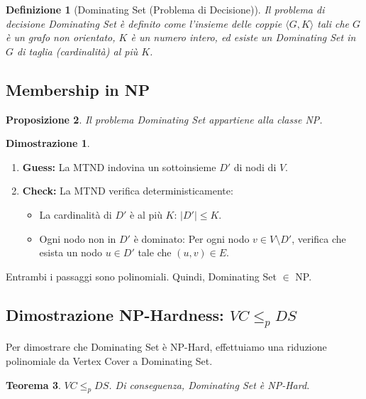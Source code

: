 \documentclass[a4paper, 11pt]{book} %
\newtheorem{theorem}{Teorema}[section]
\newtheorem{definition}[theorem]{Definizione}
\newtheorem{proposition}[theorem]{Proposizione}
\theoremstyle{definition}
\newtheorem*{proof*}{Dimostrazione}
\begin{document}
\begin{definition}[Dominating Set (Problema di Decisione)]
Il problema di decisione \emph{Dominating Set} è definito come l'insieme delle coppie $\langle G, K \rangle$ tali che $G$ è un grafo non orientato, $K$ è un numero intero, ed esiste un Dominating Set in $G$ di taglia (cardinalità) al più $K$.
\end{definition}

\subsection{Membership in NP}

\begin{proposition}
Il problema \emph{Dominating Set} appartiene alla classe NP.
\end{proposition}

\begin{proof*}
\begin{enumerate}
    \item \textbf{Guess:} La MTND indovina un sottoinsieme $D'$ di nodi di $V$.
    \item \textbf{Check:} La MTND verifica deterministicamente:
    \begin{itemize}
        \item La cardinalità di $D'$ è al più $K$: $|D'| \le K$.
        \item Ogni nodo non in $D'$ è dominato: Per ogni nodo $v \in V \setminus D'$, verifica che esista un nodo $u \in D'$ tale che $(u, v) \in E$.
    \end{itemize}
\end{enumerate}
Entrambi i passaggi sono polinomiali. Quindi, Dominating Set $\in$ NP.
\end{proof*}

\subsection{Dimostrazione NP-Hardness: $VC \le_p DS$}

Per dimostrare che Dominating Set è NP-Hard, effettuiamo una riduzione polinomiale da Vertex Cover a Dominating Set.

\begin{theorem}
$VC \le_p DS$. Di conseguenza, \emph{Dominating Set} è NP-Hard.
\end{theorem}
\end{document}
